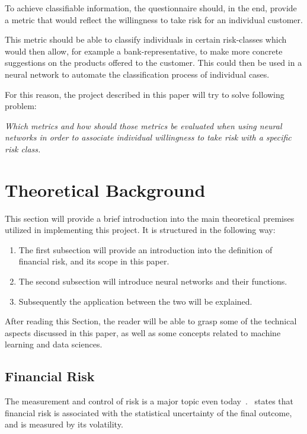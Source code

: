 \documentclass[12pt]{article}
\begin{document}
To achieve classifiable information, the questionnaire should, in the end, provide a metric that would reflect the willingness to take risk for an individual customer. 

This metric should be able to classify individuals in certain risk-classes which would then allow, for example a bank-representative, to make more concrete suggestions on the products offered to the customer. This could then be used in a neural network to automate the classification process of individual cases.

For this reason, the project described in this paper will try to solve following problem:

\textit{Which metrics and how should those metrics be evaluated when using neural networks in order to associate individual willingness to take risk with a specific risk class.}

\section{Theoretical Background}
\label{sec:theoretical_background}

This section will provide a brief introduction into the main theoretical premises utilized in implementing this project. It is structured in the following way:

\begin{enumerate}
    \item The first subsection will provide an introduction into the definition of financial risk, and its scope in this paper.
    \item The second subsection will introduce neural networks and their functions.
    \item Subsequently the application between the two will be explained.
\end{enumerate}

After reading this Section, the reader will be able to grasp some of the technical aspects discussed in this paper, as well as some concepts related to machine learning and data sciences.

\subsection{Financial Risk}
\label{sub:financial_risk}

The measurement and control of risk is a major topic even today~\citep{finRisk}.~\citet{finRisk} states that financial risk is associated with the statistical uncertainty of the final outcome, and is measured by its volatility. 
\end{document}
